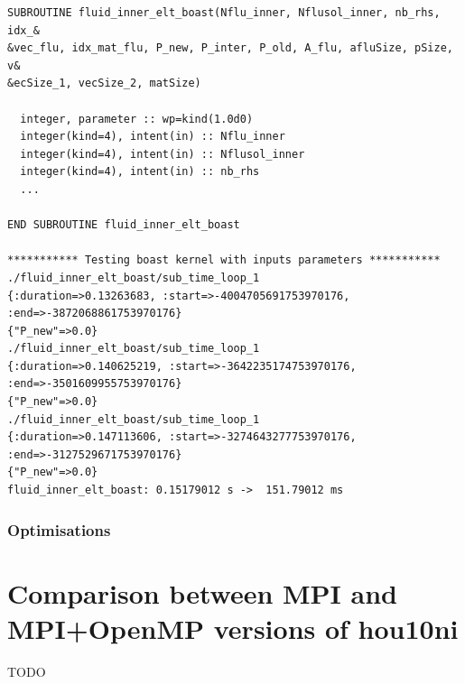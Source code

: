 \documentclass[10pt,twoside]{article}   	%
\begin{document}
\begin{lstlisting}[caption=Results (obtained with the command ruby run\_boast.rb)]
SUBROUTINE fluid_inner_elt_boast(Nflu_inner, Nflusol_inner, nb_rhs, idx_&
&vec_flu, idx_mat_flu, P_new, P_inter, P_old, A_flu, afluSize, pSize, v&
&ecSize_1, vecSize_2, matSize)

  integer, parameter :: wp=kind(1.0d0)
  integer(kind=4), intent(in) :: Nflu_inner
  integer(kind=4), intent(in) :: Nflusol_inner
  integer(kind=4), intent(in) :: nb_rhs
  ...
  
END SUBROUTINE fluid_inner_elt_boast

*********** Testing boast kernel with inputs parameters ***********
./fluid_inner_elt_boast/sub_time_loop_1
{:duration=>0.13263683, :start=>-4004705691753970176, :end=>-3872068861753970176}
{"P_new"=>0.0}
./fluid_inner_elt_boast/sub_time_loop_1
{:duration=>0.140625219, :start=>-3642235174753970176, :end=>-3501609955753970176}
{"P_new"=>0.0}
./fluid_inner_elt_boast/sub_time_loop_1
{:duration=>0.147113606, :start=>-3274643277753970176, :end=>-3127529671753970176}
{"P_new"=>0.0}
fluid_inner_elt_boast: 0.15179012 s ->  151.79012 ms  
\end{lstlisting}


\subsubsection*{Optimisations}



\section{Comparison between MPI and MPI+OpenMP versions of hou10ni}
TODO
\end{document}
